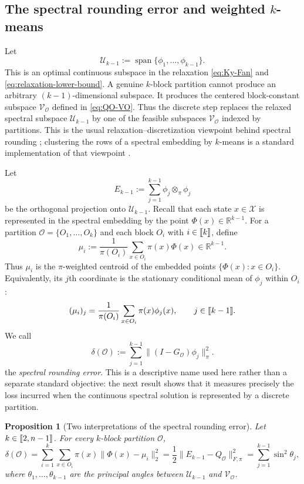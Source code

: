 \documentclass[11pt]{article}
\newtheorem{proposition}[theorem]{Proposition}
\newcommand{\1}{\mathbf{1}}
\newcommand{\X}{\mathcal{X}}
\providecommand{\llbracket}{\mathopen{[\mkern-2.7mu[}}
\providecommand{\rrbracket}{\mathclose{]\mkern-2.7mu]}}
\begin{document}
\subsection{The spectral rounding error and weighted
\texorpdfstring{$k$}{k}-means}

Let
\[
    \mathcal U_{k-1}:=\operatorname{span}\{\phi_1,\ldots,\phi_{k-1}\}.
\]
This is an optimal continuous subspace in the relaxation
\eqref{eq:Ky-Fan} and \eqref{eq:relaxation-lower-bound}.  A genuine $k$-block partition cannot produce an
arbitrary $(k-1)$-dimensional subspace.  It produces the centered
block-constant subspace $\mathcal V_{\mathcal O}$ defined in
\eqref{eq:QO-VO}.  Thus the discrete step replaces
the relaxed spectral subspace $\mathcal U_{k-1}$ by one of the feasible
subspaces $\mathcal V_{\mathcal O}$ indexed by partitions.  This is
the usual relaxation--discretization viewpoint behind spectral
rounding \citep{YuShi2003}; clustering the rows of a spectral embedding
by $k$-means is a standard implementation of that viewpoint
\citep{NgJordanWeiss2001,PengSunZanetti2017}.

Let
\[
E_{k-1}
:=\sum_{j=1}^{k-1}\phi_j\otimes_\pi\phi_j
\]
be the orthogonal projection onto
$\mathcal U_{k-1}$.  Recall that each state $x\in\X$ is represented
in the spectral embedding by the point
$\Phi(x)\in\mathbb R^{k-1}$.  For a partition
$\mathcal O=\{O_1,\ldots,O_k\}$ and each block $O_i$ with
$i\in\llbracket k\rrbracket$, define
\[
\mu_i
:=\frac{1}{\pi(O_i)}
\sum_{x\in O_i}\pi(x)\Phi(x)
\in\mathbb R^{k-1}.
\]
Thus $\mu_i$ is the $\pi$-weighted centroid of the embedded points
$\{\Phi(x):x\in O_i\}$.  Equivalently, its $j$th coordinate is the
stationary conditional mean of $\phi_j$ within $O_i$:
\[
(\mu_i)_j
=\frac{1}{\pi(O_i)}
\sum_{x\in O_i}\pi(x)\phi_j(x),
\qquad j\in\llbracket k-1\rrbracket.
\]
We call
\begin{equation}
    \delta(\mathcal O)
    :=\sum_{j=1}^{k-1}
      \|(I-G_{\mathcal O})\phi_j\|_\pi^2.
    \label{eq:delta-k}
\end{equation}
the \emph{spectral rounding error}.  This is a descriptive name used
here rather than a separate standard objective: the next result shows
that it measures precisely the loss incurred when the continuous
spectral solution is represented by a discrete partition.

\begin{proposition}[Two interpretations of the spectral rounding error]
\label{prop:kmeans-identity}
Let $k\in\llbracket 2,n-1\rrbracket$.
For every $k$-block partition $\mathcal O$,
\begin{equation}
    \delta(\mathcal O)
    =\sum_{i=1}^k\sum_{x\in O_i}
      \pi(x)\|\Phi(x)-\mu_i\|_2^2
    =\frac12\|E_{k-1}-Q_{\mathcal O}\|_{F,\pi}^2
    =\sum_{j=1}^{k-1}\sin^2\theta_j,
    \label{eq:kmeans-identity}
\end{equation}
where $\theta_1,\ldots,\theta_{k-1}$ are the principal angles between
$\mathcal U_{k-1}$ and $\mathcal V_{\mathcal O}$.
\end{proposition}
\end{document}
